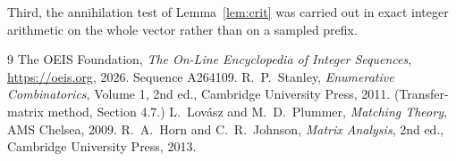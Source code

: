 \documentclass[11pt,a4paper]{article}
\theoremstyle{plain}
\theoremstyle{definition}
\begin{document}
Third, the annihilation test of Lemma~\ref{lem:crit} was carried out in exact integer
arithmetic on the whole vector rather than on a sampled prefix.

\begin{thebibliography}{9}
 The OEIS Foundation, \emph{The On-Line Encyclopedia of Integer
Sequences}, \url{https://oeis.org}, 2026. Sequence A264109.
 R.~P.~Stanley, \emph{Enumerative Combinatorics}, Volume 1, 2nd ed.,
Cambridge University Press, 2011. (Transfer-matrix method, Section 4.7.)
 L.~Lov\'asz and M.~D.~Plummer, \emph{Matching Theory}, AMS Chelsea, 2009.
 R.~A.~Horn and C.~R.~Johnson, \emph{Matrix Analysis}, 2nd ed., Cambridge
University Press, 2013.
\end{thebibliography}
\end{document}
